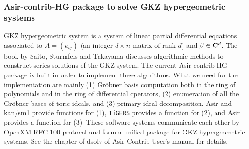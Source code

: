 \subsubsection{Asir-contrib-HG package to solve GKZ hypergeometric systems}

GKZ hypergeometric system is a system of linear partial differential
equations associated to $A=(a_{ij})$  
(an integer $d\times n$-matrix of rank $d$)
and $\beta \in {\bf C}^d$.
The book by Saito, Sturmfels and Takayama \cite{sst-book}
discusses algorithmic methods to construct series solutions of the GKZ
system.
The current Asir-contrib-HG package is built in order to implement
these algorithms.
What we need for the implementation are mainly
(1) Gr\"obner basis computation both in the ring of polynomials
and in the ring of differential operators,
(2) enumeration of all the Gr\"obner bases of toric ideals,
and 
(3) primary ideal decomposition.
Asir and kan/sm1 provide functions for (1),
{\tt TiGERS} provides a function for (2),
and
Asir provides a function for (3).
These software systems communicate each other by OpenXM-RFC 100 protocol
and form a unified package for GKZ hypergeometric systems.
See the chapter of dsolv of Asir Contrib User's manual \cite{openxm-web}
for details.


